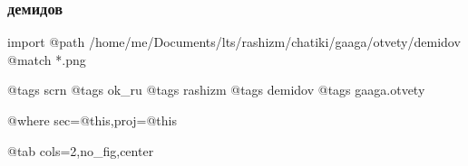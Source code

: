  
 
 
 
 

\subsubsection{демидов}

\ifcmt
  import
    @path /home/me/Documents/lts/rashizm/chatiki/gaaga/otvety/demidov
    @match *.png

    @tags scrn
    @tags ok_ru
    @tags rashizm
    @tags demidov
    @tags gaaga.otvety

    @where sec=@this,proj=@this
  
    @tab cols=2,no_fig,center
\fi
